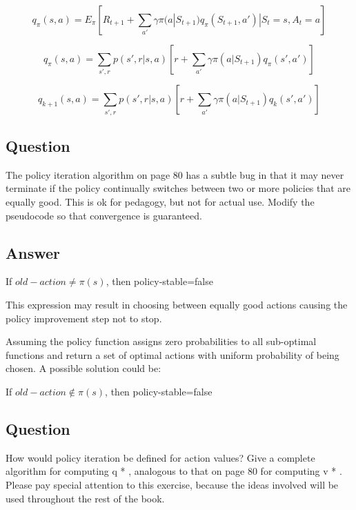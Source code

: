 \documentclass[11pt]{article}
\begin{document}
    \begin{equation}
        q_{\pi}(s, a) = E_\pi [R_{t+1} + \sum_{a'}  \gamma  \pi(a|S_{t+1}) q_{\pi} (S_{t+1}, a') | S_t = s, A_t = a]
    \end{equation}

    \begin{equation}
        q_{\pi}(s, a) = \sum_{s',r} p(s', r | s, a) [r + \sum_{a'} \gamma \pi(a|S_{t+1}) q_\pi(s', a')]
    \end{equation}

    \begin{equation}
        \label{eqn:eq4_5}
        q_{k+1}(s, a) = \sum_{s',r} p(s', r | s, a) [r + \sum_{a'} \gamma \pi(a|S_{t+1}) q_k(s', a')]
    \end{equation}

    \subsection{Question}

    The policy iteration algorithm on page 80 has a subtle bug in that it may never terminate if the policy continually switches between two or more policies that are equally good.
    This is ok for pedagogy, but not for actual use.
    Modify the pseudocode so that convergence is guaranteed.

    \subsection*{Answer}

    If $old-action \neq \pi(s)$, then policy-stable=false

    This expression may result in choosing between equally good actions causing the policy improvement step not to stop.

    Assuming the policy function assigns zero probabilities to all sub-optimal functions and return a set of optimal actions with uniform probability of being chosen. A possible solution could be:

    If $old-action \notin \pi(s)$, then policy-stable=false

    \subsection{Question}

    How would policy iteration be defined for action values?
    Give a complete algorithm for computing q * , analogous to that on page 80 for computing v * .
    Please pay special attention to this exercise, because the ideas involved will be used throughout the rest of the book.
\end{document}
